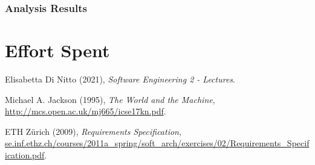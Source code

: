 \documentclass[a4paper,11pt]{report}
\begin{document}
\subsection{Analysis Results}


\chapter{Effort Spent}


\begin{thebibliography}{9}
Elisabetta Di Nitto (2021),
\emph{Software Engineering 2 - Lectures}.

Michael A. Jackson (1995),
\emph{The World and the Machine},
\url{http://mcs.open.ac.uk/mj665/icse17kn.pdf}.

ETH Zürich (2009),
\emph{Requirements Specification},
\url{se.inf.ethz.ch/courses/2011a_spring/soft_arch/exercises/02/Requirements_Specification.pdf}.

\end{thebibliography}
\end{document}
